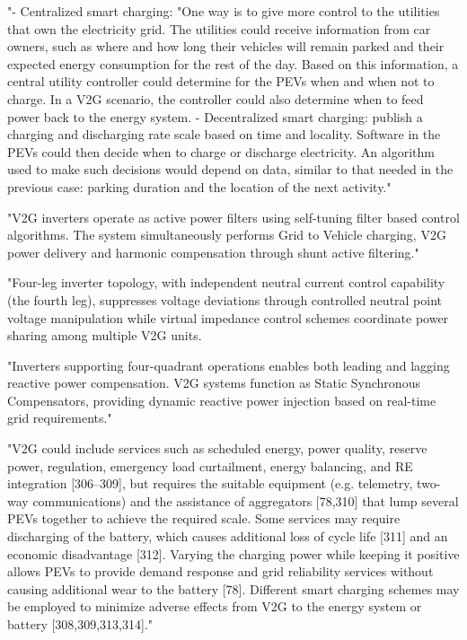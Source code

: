 "- Centralized smart charging: "One way is to give more control to the utilities that own the electricity grid. The utilities could receive information from car owners, such as where and how long their vehicles will remain parked and their expected energy consumption for the rest of the day. Based on this information, a central utility controller could determine for the PEVs when and when not to charge. In a V2G scenario, the controller could also determine when to feed power back to the energy system.
- Decentralized smart charging: publish a charging and discharging rate scale based on time and locality. Software in the PEVs could then decide when to charge or discharge electricity. An algorithm used to make such decisions would depend on data, similar to that needed in the previous case: parking duration and the location of the next activity." \cite{rashid_a_waraich_plug-hybrid_2013}


"V2G inverters operate as active power filters using self-tuning filter based control algorithms. The system simultaneously performs Grid to Vehicle charging, V2G power delivery and harmonic compensation through shunt active filtering."


"Four-leg inverter topology, with independent neutral current control capability (the fourth leg), suppresses voltage deviations through controlled neutral point voltage manipulation while virtual impedance control schemes coordinate power sharing among multiple V2G units. 

"Inverters supporting four-quadrant operations enables both leading and lagging reactive power compensation. V2G systems function as Static Synchronous Compensators, providing dynamic reactive power injection based on real-time grid requirements."




"V2G could include services such as scheduled energy, power quality, reserve power, regulation, emergency load curtailment, energy balancing, and RE integration [306–309], but requires the suitable equipment (e.g. telemetry, two-way communications) and the assistance of aggregators [78,310] that lump several PEVs together to achieve the required scale. Some services may require discharging of the battery, which causes additional loss of cycle life [311] and an economic disadvantage [312]. Varying the charging power while keeping it positive allows PEVs to provide demand response and grid reliability services without causing additional wear to the battery [78]. Different smart charging schemes may be employed to minimize adverse effects from V2G to the energy system or battery [308,309,313,314]." \cite{lund_review_2015}

